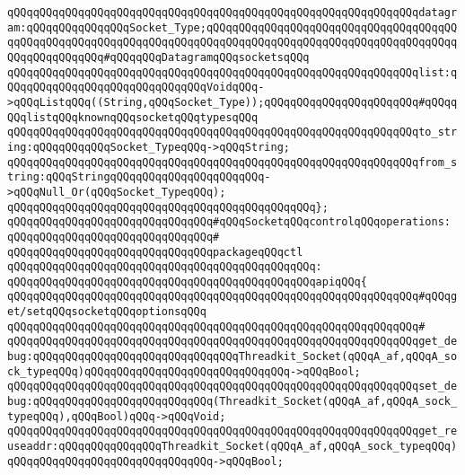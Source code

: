 \verb|qQQqqQQqqQQqqQQqqQQqqQQqqQQqqQQqqQQqqQQqqQQqqQQqqQQqqQQqqQQqqQQqdatagram:qQQqqQQqqQQqqQQqSocket_Type;qQQqqQQqqQQqqQQqqQQqqQQqqQQqqQQqqQQqqQQqqQQqqQQqqQQqqQQqqQQqqQQqqQQqqQQqqQQqqQQqqQQqqQQqqQQqqQQqqQQqqQQqqQQqqQQqqQQqqQQqqQQq#qQQqqQQqDatagramqQQqsocketsqQQq|\newline
\newline
\verb|qQQqqQQqqQQqqQQqqQQqqQQqqQQqqQQqqQQqqQQqqQQqqQQqqQQqqQQqqQQqqQQqlist:qQQqqQQqqQQqqQQqqQQqqQQqqQQqqQQqVoidqQQq->qQQqListqQQq((String,qQQqSocket_Type));qQQqqQQqqQQqqQQqqQQqqQQq#qQQqqQQqlistqQQqknownqQQqsocketqQQqtypesqQQq|\newline
\newline
\verb|qQQqqQQqqQQqqQQqqQQqqQQqqQQqqQQqqQQqqQQqqQQqqQQqqQQqqQQqqQQqqQQqto_string:qQQqqQQqqQQqSocket_TypeqQQq->qQQqString;|\newline
\verb|qQQqqQQqqQQqqQQqqQQqqQQqqQQqqQQqqQQqqQQqqQQqqQQqqQQqqQQqqQQqqQQqfrom_string:qQQqStringqQQqqQQqqQQqqQQqqQQqqQQq->qQQqNull_Or(qQQqSocket_TypeqQQq);|\newline
\verb|qQQqqQQqqQQqqQQqqQQqqQQqqQQqqQQqqQQqqQQqqQQqqQQq};|\newline
\newline
\verb|qQQqqQQqqQQqqQQqqQQqqQQqqQQqqQQq#qQQqSocketqQQqcontrolqQQqoperations:|\newline
\verb|qQQqqQQqqQQqqQQqqQQqqQQqqQQqqQQq#|\newline
\verb|qQQqqQQqqQQqqQQqqQQqqQQqqQQqqQQqpackageqQQqctl|\newline
\verb|qQQqqQQqqQQqqQQqqQQqqQQqqQQqqQQqqQQqqQQqqQQqqQQq:|\newline
\verb|qQQqqQQqqQQqqQQqqQQqqQQqqQQqqQQqqQQqqQQqqQQqqQQqapiqQQq{|\newline
\verb|qQQqqQQqqQQqqQQqqQQqqQQqqQQqqQQqqQQqqQQqqQQqqQQqqQQqqQQqqQQqqQQq#qQQqget/setqQQqsocketqQQqoptionsqQQq|\newline
\verb|qQQqqQQqqQQqqQQqqQQqqQQqqQQqqQQqqQQqqQQqqQQqqQQqqQQqqQQqqQQqqQQq#|\newline
\verb|qQQqqQQqqQQqqQQqqQQqqQQqqQQqqQQqqQQqqQQqqQQqqQQqqQQqqQQqqQQqqQQqget_debug:qQQqqQQqqQQqqQQqqQQqqQQqqQQqqQQqThreadkit_Socket(qQQqA_af,qQQqA_sock_typeqQQq)qQQqqQQqqQQqqQQqqQQqqQQqqQQqqQQq->qQQqBool;|\newline
\verb|qQQqqQQqqQQqqQQqqQQqqQQqqQQqqQQqqQQqqQQqqQQqqQQqqQQqqQQqqQQqqQQqset_debug:qQQqqQQqqQQqqQQqqQQqqQQqqQQq(Threadkit_Socket(qQQqA_af,qQQqA_sock_typeqQQq),qQQqBool)qQQq->qQQqVoid;|\newline
\verb|qQQqqQQqqQQqqQQqqQQqqQQqqQQqqQQqqQQqqQQqqQQqqQQqqQQqqQQqqQQqqQQqget_reuseaddr:qQQqqQQqqQQqqQQqThreadkit_Socket(qQQqA_af,qQQqA_sock_typeqQQq)qQQqqQQqqQQqqQQqqQQqqQQqqQQqqQQq->qQQqBool;|\newline
